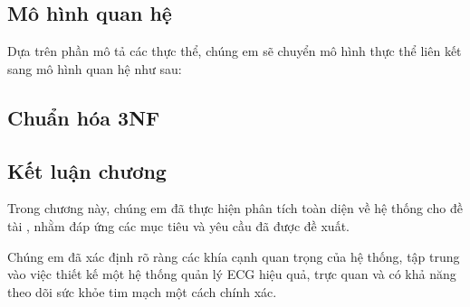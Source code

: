 \subsection{Mô hình quan hệ}
Dựa trên phần mô tả các thực thể, chúng em sẽ chuyển mô hình thực thể liên kết sang mô hình quan hệ như sau:

\subsection{Chuẩn hóa 3NF}


\subsection{Kết luận chương}

Trong chương này, chúng em đã thực hiện phân tích toàn diện về
 hệ thống cho đề tài , nhằm đáp ứng
  các mục tiêu và yêu cầu đã được đề xuất.

Chúng em đã xác định rõ ràng các khía cạnh quan trọng của hệ thống,
 tập trung vào việc thiết kế một hệ thống quản lý ECG hiệu quả,
  trực quan và có khả năng theo dõi sức khỏe tim mạch một cách
   chính xác. 


\newpage
